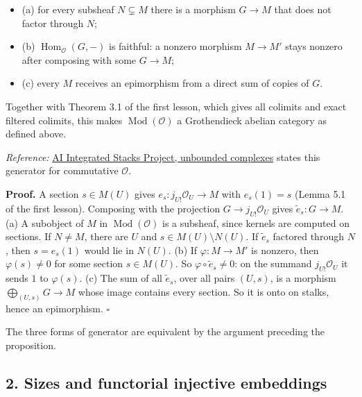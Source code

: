\documentclass[
  english,
  11pt,
  a4paper,
]{article}
\providecommand{\tightlist}{%
  \setlength{\itemsep}{0pt}\setlength{\parskip}{0pt}}
\begin{document}
\begin{itemize}
\tightlist
\item
  (a) for every subsheaf \(N\subsetneq M\) there is a morphism
  \(G\to M\) that does not factor through \(N\);
\item
  (b) \(\operatorname{Hom}_{\mathcal O}(G,-)\) is faithful: a nonzero
  morphism \(M\to M'\) stays nonzero after composing with some
  \(G\to M\);
\item
  (c) every \(M\) receives an epimorphism from a direct sum of copies of
  \(G\).
\end{itemize}

Together with Theorem 3.1 of the first lesson, which gives all colimits
and exact filtered colimits, this makes
\(\operatorname{Mod}(\mathcal O)\) a Grothendieck abelian category as
defined above.

\emph{Reference:}
\href{https://github.com/KokunoYumeto/unofficial-stacks-project-ai-drafts/blob/565b10e987aba5969b21145a0833f42d69f96790/cohomology.tex\#L6992}{AI
Integrated Stacks Project, unbounded complexes} states this generator
for commutative \(\mathcal O\).

\textbf{Proof.} A section \(s\in M(U)\) gives
\(e_s:j_{U!}\mathcal O_U\to M\) with \(e_s(1)=s\) (Lemma 5.1 of the
first lesson). Composing with the projection \(G\to j_{U!}\mathcal O_U\)
gives \(\tilde e_s:G\to M\). (a) A subobject of \(M\) in
\(\operatorname{Mod}(\mathcal O)\) is a subsheaf, since kernels are
computed on sections. If \(N\neq M\), there are \(U\) and
\(s\in M(U)\setminus N(U)\). If \(\tilde e_s\) factored through \(N\),
then \(s=e_s(1)\) would lie in \(N(U)\). (b) If \(\varphi:M\to M'\) is
nonzero, then \(\varphi(s)\neq0\) for some section \(s\in M(U)\). So
\(\varphi\circ\tilde e_s\neq0\): on the summand \(j_{U!}\mathcal O_U\)
it sends \(1\) to \(\varphi(s)\). (c) The sum of all \(\tilde e_s\),
over all pairs \((U,s)\), is a morphism \(\bigoplus_{(U,s)}G\to M\)
whose image contains every section. So it is onto on stalks, hence an
epimorphism. \(\square\)

The three forms of generator are equivalent by the argument preceding
the proposition.

\subsection{2. Sizes and functorial injective
embeddings}\label{k-injective-resolutions-in-grothendieck-categories--2-sizes-and-functorial-injective-embeddings}
\end{document}
